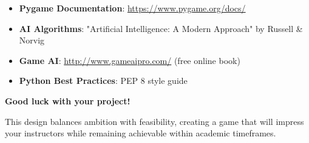 \documentclass[12pt,a4paper]{article}
\begin{document}
\begin{itemize}
    \item \textbf{Pygame Documentation}: \url{https://www.pygame.org/docs/}
    \item \textbf{AI Algorithms}: "Artificial Intelligence: A Modern Approach" by Russell \& Norvig
    \item \textbf{Game AI}: \url{http://www.gameaipro.com/} (free online book)
    \item \textbf{Python Best Practices}: PEP 8 style guide
\end{itemize}

\vspace{1cm}

\begin{center}
\large
\textbf{Good luck with your project!}

\vspace{0.5cm}

This design balances ambition with feasibility, creating a game that will impress your instructors while remaining achievable within academic timeframes.
\end{center}
\end{document}

